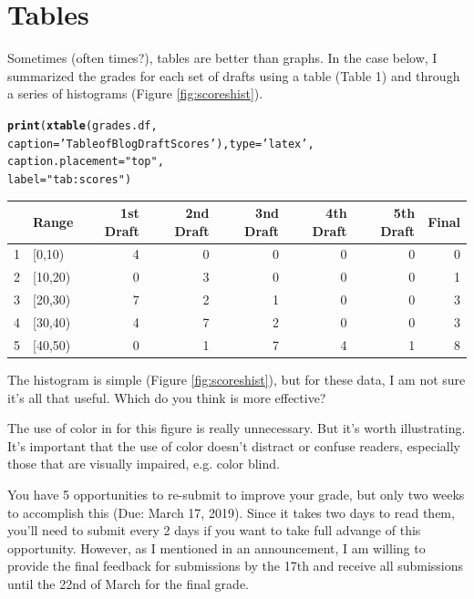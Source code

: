 \documentclass{article}\usepackage[]{graphicx}\usepackage[]{color}
\makeatletter
\newcommand{\hlstr}[1]{\textcolor[rgb]{0.192,0.494,0.8}{#1}}%
\newcommand{\hlstd}[1]{\textcolor[rgb]{0.345,0.345,0.345}{#1}}%
\newcommand{\hlkwc}[1]{\textcolor[rgb]{0.333,0.667,0.333}{#1}}%
\newcommand{\hlkwd}[1]{\textcolor[rgb]{0.737,0.353,0.396}{\textbf{#1}}}%
\newenvironment{kframe}{%
 \def\at@end@of@kframe{}%
 \ifinner\ifhmode%
  \def\at@end@of@kframe{\end{minipage}}%
  \begin{minipage}{\columnwidth}%
 \fi\fi%
 \def\FrameCommand##1{\hskip\@totalleftmargin \hskip-\fboxsep
 \colorbox{shadecolor}{##1}\hskip-\fboxsep
     \hskip-\linewidth \hskip-\@totalleftmargin \hskip\columnwidth}%
 \MakeFramed {\advance\hsize-\width
   \@totalleftmargin\z@ \linewidth\hsize
   \@setminipage}}%
 {\par\unskip\endMakeFramed%
 \at@end@of@kframe}
\makeatother
\begin{document}
\section{Tables}

Sometimes (often times?), tables are better than graphs. In the case below, I summarized the grades for each set of drafts using a table (Table 1) and through a series of histograms (Figure \ref{fig:scoreshist}). 




\begin{kframe}
\begin{alltt}
\hlkwd{print}\hlstd{(}\hlkwd{xtable}\hlstd{(grades.df,}
      \hlkwc{caption}\hlstd{=}\hlstr{'Table of Blog Draft Scores'}\hlstd{),} \hlkwc{type}\hlstd{=}\hlstr{'latex'}\hlstd{,}
      \hlkwc{caption.placement} \hlstd{=} \hlstr{"top"}\hlstd{,}
      \hlkwc{label}\hlstd{=}\hlstr{"tab:scores"}\hlstd{)}
\end{alltt}
\end{kframe}%
% 
\begin{tabular}{rlrrrrrr}
  \hline
 & Range & 1st Draft & 2nd Draft & 3nd Draft & 4th Draft & 5th Draft & Final \\ 
  \hline
1 & [0,10) &   4 &   0 &   0 &   0 &   0 &   0 \\ 
  2 & [10,20) &   0 &   3 &   0 &   0 &   0 &   1 \\ 
  3 & [20,30) &   7 &   2 &   1 &   0 &   0 &   3 \\ 
  4 & [30,40) &   4 &   7 &   2 &   0 &   0 &   3 \\ 
  5 & [40,50) &   0 &   1 &   7 &   4 &   1 &   8 \\ 
   \hline
\end{tabular}


\bigskip

The histogram is simple (Figure \ref{fig:scoreshist}), but for these data, I am not sure it's all that useful. Which do you think is more effective? 

The use of color in for this figure is really unnecessary. But it's worth illustrating. It's important that the use of color doesn't distract or confuse readers, especially those that are visually impaired, e.g. color blind.

You have 5 opportunities to re-submit to improve your grade, but only two weeks to accomplish this (Due: March 17, 2019). Since it takes two days to read them, you'll need to submit every 2 days if you want to take full advange of this opportunity. However, as I mentioned in an announcement, I am willing to provide the final feedback for submissions by the 17th and receive all submissions until the 22nd of March for the final grade. 
\end{document}
